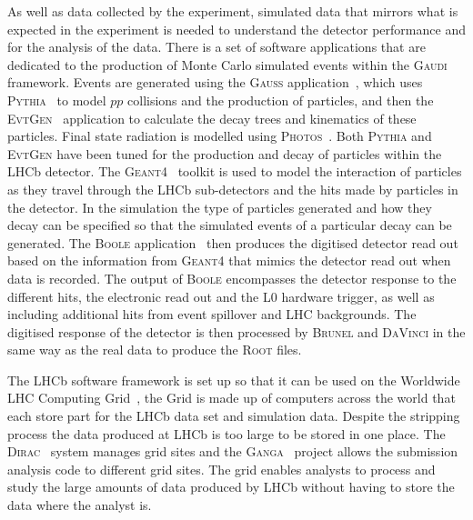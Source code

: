 As well as data collected by the experiment, simulated data that mirrors what is expected in the experiment is needed to understand the detector performance and for the analysis of the data. There is a set of software applications that are dedicated to the production of Monte Carlo simulated events within the \textsc{Gaudi} framework. Events are generated using the \textsc{Gauss} application~\cite{1742-6596-331-3-032047, Clemencic:2011zza}, which uses \textsc{Pythia}~\cite{Sjostrand:2006za,Sjostrand:2007gs} to model $pp$ collisions and the production of particles, and then the \textsc{Evt}\textsc{Gen}~\cite{Lange:2001uf} application to calculate the decay trees and kinematics of these particles. Final state radiation is modelled using \textsc{Photos}~\cite{Golonka:2005pn}. Both \textsc{Pythia} and \textsc{Evt}\textsc{Gen} have been tuned for the production and decay of particles within the LHCb detector. The \textsc{Geant4}~\cite{Agostinelli:2002hh,Allison:2006ve} toolkit is used to model the interaction of particles as they travel through the LHCb sub-detectors and the hits made by particles in the detector. In the simulation the type of particles generated and how they decay can be specified so that the simulated events of a particular decay can be generated. The \textsc{Boole} application~\cite{boole} then produces the digitised detector read out based on the information from \textsc{Geant4} that mimics the detector read out when data is recorded. The output of \textsc{Boole} encompasses the detector response to the different hits, the electronic read out and the L0 hardware trigger, as well as including additional hits from event spillover and LHC backgrounds. The digitised response of the detector is then processed by \textsc{Brunel} and \textsc{DaVinci} in the same way as the real data to produce the \textsc{Root} files. %

The LHCb software framework is set up so that it can be used on the Worldwide LHC Computing Grid~\cite{Bird:2011zz, WWCG}, the Grid is made up of computers across the world that each store part for the LHCb data set and simulation data. Despite the stripping process the data produced at LHCb is too large to be stored in one place. The \textsc{Dirac}~\cite{Paterson:1397926} system manages grid sites and the \textsc{Ganga}~\cite{Ganga, Ganga2} project allows the submission analysis code to different grid sites. The grid enables analysts to process and study the large amounts of data produced by LHCb without having to store the data where the analyst is. 





